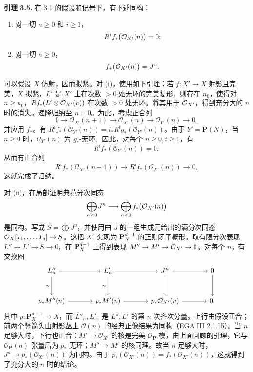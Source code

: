 \textbf{引理 3.5.} 在 \hyperlink{sga6.e07.para.3-1}{3.1} 的假设和记号下，有下述同构：
\begin{enumerate}[label=\roman*)]
\item 对一切 \(n\ge0\) 和 \(i\ge1\)，
\[
R^if_*\bigl(\mathcal O_{X'}(n)\bigr)=0;
\]
\item 对一切 \(n\ge0\)，
\[
f_*\bigl(\mathcal O_{X'}(n)\bigr)=J^n.
\]
\end{enumerate}
可以假设 \(X\) 仿射，因而拟紧。对 (i)，使用如下引理：若 \(f:X'\to X\) 射影且完美，\(X\) 拟紧，\(L'\) 是 \(X'\) 上在次数 \(>0\) 处无环的完美复形，则存在 \(n_0\)，使得对 \(n\ge n_0\)，\(Rf_*(L'\otimes\mathcal O_{X'}(n))\) 在次数 \(>0\) 处无环。将其用于 \(\mathcal O_{X'}\)，得到充分大的 \(n\) 时的消失。递降归纳至 \(n=0\)。为此，考虑正合列
\[
 0\longrightarrow\mathcal O_{X'}(n+1)\longrightarrow\mathcal O_{X'}(n)
 \longrightarrow\mathcal O_{Y'}(n)\longrightarrow0,
\]
并应用 \(f_*\)。有 \(R^if_*(\mathcal O_{Y'}(n))=i_*R^ig_*(\mathcal O_{Y'}(n))\)。由于 \(Y'=\mathbf P(N)\)，当 \(n\geq0\) 时，\(\mathcal O_{Y'}(n)\) 为 \(g_*\)-无环。因此，对每个 \(n\geq0,i\geq1\)，有
\[
 R^if_*(\mathcal O_{Y'}(n))=0,
\]
从而有正合列
\[
 R^if_*(\mathcal O_{X'}(n+1))\longrightarrow
 R^if_*(\mathcal O_{X'}(n))\longrightarrow0,
\]
这就完成了归纳。

对 (ii)，在局部证明典范分次同态
\[
\bigoplus_{n\ge0}J^n\longrightarrow\bigoplus_{n\ge0}f_*\bigl(\mathcal O_{X'}(n)\bigr)
\]
是同构。写成 \(S=\bigoplus J^n\)，并使用由 \(J\) 的一组生成元给出的满分次同态 \(\mathcal O_X[T_1,\ldots,T_d]\to S\)。这把 \(X'\) 实现为 \(\mathbf P_X^{d-1}\) 的正则闭子概形。取有限分次表现 \(L''\to L'\to S\to0\)，在 \(\mathbf P_X^{d-1}\) 上得到表现 \(M''\to M'\to\mathcal O_{X'}\to0\)。对每个 \(n\)，有交换图
\[
\begin{tikzcd}[column sep=large,row sep=large]
L''_n \arrow[r] \arrow[d,"\sim"'] & L'_n \arrow[r] \arrow[d,"\sim"'] & J^n \arrow[r] \arrow[d] & 0 \arrow[d]\\
p_*M''(n) \arrow[r] & p_*M'(n) \arrow[r] & p_*\cO_{X'}(n) \arrow[r] & 0,
\end{tikzcd}
\]
其中 \(p:\mathbf P_X^{d-1}\to X\)，而 \(L''_n,L'_n\) 是 \(L'',L'\) 的第 \(n\) 次齐次分量。上行由假设正合；前两个竖箭头由射影丛上 \(\mathcal O(n)\) 的经典正像结果为同构（EGA III 2.1.15）。当 \(n\) 足够大时，下行也正合：\(M'\to\mathcal O_{X'}\) 的核是完美 \(\mathcal O_{\mathbf P}\)-模，由上面回顾的引理，它与 \(\mathcal O_{\mathbf P}(n)\) 张量后为 \(p_*\)-无环；\(M''\to M'\) 的核同理。故当 \(n\) 足够大时，\(J^n\to p_*(\mathcal O_{X'}(n))\) 为同构。由于 \(p_*(\mathcal O_{X'}(n))=f_*(\mathcal O_{X'}(n))\)，这就得到了充分大的 \(n\) 时的结论。

